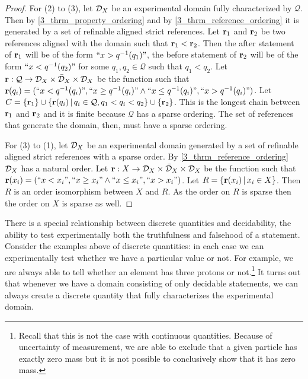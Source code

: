 \documentclass[11pt,letterpaper,fleqn]{memoir} %
\begin{document}
\begin{mathSection}
\begin{proof}
	For (2) to (3), let $\mathcal{D}_X$ be an experimental domain fully characterized by $\mathcal{Q}$. Then by \ref{3_thrm_property_ordering} and by \ref{3_thrm_reference_ordering} it is generated by a set of refinable aligned strict references. Let $\textbf{r}_1$ and $\textbf{r}_2$ be two references aligned with the domain such that $\textbf{r}_1 < \textbf{r}_2$. Then the after statement of $\textbf{r}_1$ will be of the form $``x > q^{-1}(q_1)"$, the before statement of $\textbf{r}_2$ will be of the form $``x < q^{-1}(q_2)"$ for some $q_1, q_2 \in \mathcal{Q}$ such that $q_1 < q_2$. Let $\textbf{r} : \mathcal{Q} \to \mathcal{D}_X \times \bar{\mathcal{D}}_X \times \mathcal{D}_X$ be the function such that $\textbf{r}(q_i) = (``x < q^{-1}(q_i)", ``x \geq q^{-1}(q_i)" \wedge ``x \leq q^{-1}(q_i)", ``x > q^{-1}(q_i)")$. Let $C = \{\textbf{r}_1\} \cup \{\textbf{r}(q_i) \, | \, q_i \in \mathcal{Q}, q_1 < q_i < q_2  \} \cup \{ \textbf{r}_2 \}$. This is the longest chain between $\textbf{r}_1$ and $\textbf{r}_2$ and it is finite because $\mathcal{Q}$ has a sparse ordering. The set of references that generate the domain, then, must have a sparse ordering.
	
	For (3) to (1), let $\mathcal{D}_X$ be an experimental domain generated by a set of refinable aligned strict references with a sparse order. By \ref{3_thrm_reference_ordering} $\mathcal{D}_X$ has a natural order. Let $\textbf{r} : X \to \mathcal{D}_X \times \bar{\mathcal{D}}_X \times \mathcal{D}_X$ be the function such that $\textbf{r}(x_i) = (``x < x_i", ``x \geq x_i" \wedge ``x \leq x_i", ``x > x_i")$. Let $R=\{ \textbf{r}(x_i) \, | \, x_i \in X \}$. Then $R$ is an order isomorphism between $X$ and $R$. As the order on $R$ is sparse then the order on $X$ is sparse as well.
\end{proof}
\end{mathSection}

There is a special relationship between discrete quantities and decidability, the ability to test experimentally both the truthfulness and falsehood of a statement. Consider the examples above of discrete quantities: in each case we can experimentally test whether we have a particular value or not. For example, we are always able to tell whether an element has three protons or not.\footnote{Recall that this is not the case with continuous quantities. Because of uncertainty of measurement, we are able to exclude that a given particle has exactly zero mass but it is not possible to conclusively show that it has zero mass.} It turns out that whenever we have a domain consisting of only decidable statements, we can always create a discrete quantity that fully characterizes the experimental domain.
\end{document}
